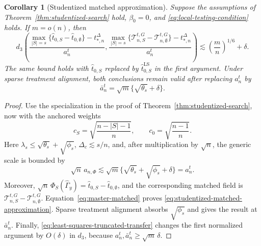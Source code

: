 \documentclass[a4paper,11pt,english]{article}
\newtheorem{corollary}[theorem]{Corollary}
\begin{document}
\begin{corollary}[Studentized matched approximation]
\label{cor:studentized-matched-approximation}
Suppose the assumptions of Theorem~\ref{thm:studentized-search} hold,
$\beta_0=0$, and \eqref{eq:local-testing-condition} holds.  If
$m=o(n)$, then
\begin{equation}\label{eq:studentized-matched-approximation}
 d_3\!\left(
 \frac{\max_{|S|=s}\{\hat t_{0,S}-\hat t_{0,\emptyset}\}
       -t_{*,n}^\Delta}{a_n^t},
 \frac{\max_{|S|=s}\{\mathcal T^{t,G}_{n,S}
       -\mathcal T^{t,G}_{n,\emptyset}\}-t_{*,n}^\Delta}{a_n^t}
 \right)
 \lesssim \left(\frac mn\right)^{1/6}+\delta.
\end{equation}
The same bound holds with $\hat t_{0,S}$ replaced by
$\hat t^{\mathrm{LS}}_{0,S}$ in the first argument.  Under sparse
treatment alignment, both conclusions remain valid after replacing
$a_n^t$ by
\begin{equation*}
 \bar a_n^t=\sqrt m\{\sqrt{\theta_s}+\delta\}.
\end{equation*}
\end{corollary}

\begin{proof}
Use the specialization in the proof of
Theorem~\ref{thm:studentized-search}, now with the anchored weights
\begin{equation*}
 c_S=\sqrt{\frac{n-|S|-1}{n}},
 \qquad c_0=\sqrt{\frac{n-1}{n}}.
\end{equation*}
Here $\lambda_s\le\sqrt{\theta_s}+\sqrt{\phi_s}$,
$\Delta_c\lesssim s/n$, and, after multiplication by $\sqrt n$, the
generic scale is bounded by
\begin{equation*}
 \sqrt n\,a_{n,\Phi}
 \lesssim\sqrt m\{\sqrt{\theta_s}+\sqrt{\phi_s}+\delta\}=a_n^t.
\end{equation*}
Moreover,
$\sqrt n\,\Phi_S(\hat\Gamma_y)=
\hat t_{0,S}-\hat t_{0,\emptyset}$, and the corresponding matched field
is $\mathcal T^{t,G}_{n,S}-\mathcal T^{t,G}_{n,\emptyset}$.
Equation~\eqref{eq:master-matched} proves
\eqref{eq:studentized-matched-approximation}.  Sparse treatment alignment
absorbs $\sqrt{\phi_s}$ and gives the result at $\bar a_n^t$.
Finally, \eqref{eq:least-squares-truncated-transfer} changes the first
normalized argument by $O(\delta)$ in $d_3$, because
$a_n^t,\bar a_n^t\ge\sqrt m\,\delta$.
\end{proof}
\end{document}

